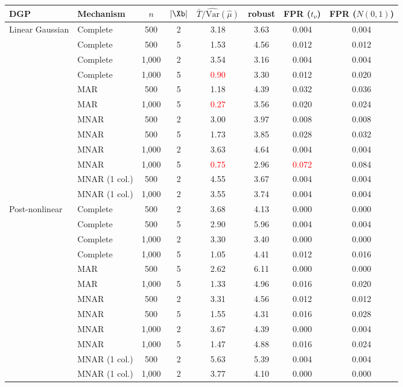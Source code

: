 \begin{tabular}{llcccccc}
    \toprule
    DGP & Mechanism & $n$ & $|\Xb|$ & $\bar T/\widehat{\mathrm{Var}}(\hat\mu)$ & robust & FPR ($t_\nu$) & FPR ($N(0,1)$) \\
    \midrule
    Linear Gaussian  & Complete       & 500 & 2 & 3.18 & 3.63 & 0.004 & 0.004 \\
                     & Complete       & 500 & 5 & 1.53 & 4.56 & 0.012 & 0.012 \\
                     & Complete       & 1,000 & 2 & 3.54 & 3.16 & 0.004 & 0.004 \\
                     & Complete       & 1,000 & 5 & \textcolor{red}{0.90} & 3.30 & 0.012 & 0.020 \\
                     & MAR            & 500 & 5 & 1.18 & 4.39 & 0.032 & 0.036 \\
                     & MAR            & 1,000 & 5 & \textcolor{red}{0.27} & 3.56 & 0.020 & 0.024 \\
                     & MNAR           & 500 & 2 & 3.00 & 3.97 & 0.008 & 0.008 \\
                     & MNAR           & 500 & 5 & 1.73 & 3.85 & 0.028 & 0.032 \\
                     & MNAR           & 1,000 & 2 & 3.63 & 4.64 & 0.004 & 0.004 \\
                     & MNAR           & 1,000 & 5 & \textcolor{red}{0.75} & 2.96 & \textcolor{red}{0.072} & 0.084 \\
                     & MNAR (1 col.)  & 500 & 2 & 4.55 & 3.67 & 0.004 & 0.004 \\
                     & MNAR (1 col.)  & 1,000 & 2 & 3.55 & 3.74 & 0.004 & 0.004 \\
    \midrule
    Post-nonlinear   & Complete       & 500 & 2 & 3.68 & 4.13 & 0.000 & 0.000 \\
                     & Complete       & 500 & 5 & 2.90 & 5.96 & 0.004 & 0.004 \\
                     & Complete       & 1,000 & 2 & 3.30 & 3.40 & 0.000 & 0.000 \\
                     & Complete       & 1,000 & 5 & 1.05 & 4.41 & 0.012 & 0.016 \\
                     & MAR            & 500 & 5 & 2.62 & 6.11 & 0.000 & 0.000 \\
                     & MAR            & 1,000 & 5 & 1.33 & 4.96 & 0.016 & 0.020 \\
                     & MNAR           & 500 & 2 & 3.31 & 4.56 & 0.012 & 0.012 \\
                     & MNAR           & 500 & 5 & 1.55 & 4.31 & 0.016 & 0.028 \\
                     & MNAR           & 1,000 & 2 & 3.67 & 4.39 & 0.000 & 0.004 \\
                     & MNAR           & 1,000 & 5 & 1.47 & 4.88 & 0.016 & 0.024 \\
                     & MNAR (1 col.)  & 500 & 2 & 5.63 & 5.39 & 0.004 & 0.004 \\
                     & MNAR (1 col.)  & 1,000 & 2 & 3.77 & 4.10 & 0.000 & 0.000 \\
    \bottomrule
\end{tabular}
